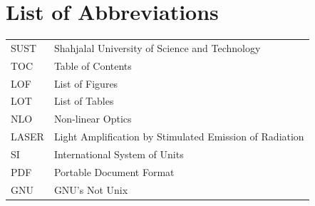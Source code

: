 
\tableofcontents
\cleardoublepage

\listoffigures
\cleardoublepage

\listoftables
\cleardoublepage

\chapter*{List of Abbreviations}

\begin{tabular}{p{} p{}}
    SUST & Shahjalal University of Science and Technology \\
    TOC  & Table of Contents \\
    LOF  & List of Figures \\
    LOT  & List of Tables \\
    NLO  & Non-linear Optics \\
    LASER& Light Amplification by Stimulated Emission of Radiation \\
    SI   & International System of Units \\
    PDF  & Portable Document Format \\
    GNU  & GNU's Not Unix \\
\end{tabular}
